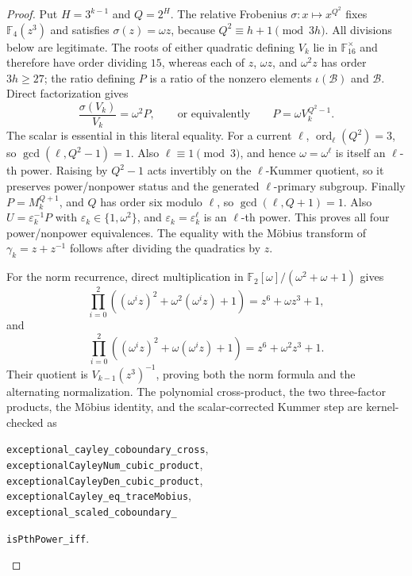 \documentclass[11pt]{article}
\theoremstyle{definition}
\theoremstyle{remark}
\begin{document}
\begin{proof}
Put $H=3^{k-1}$ and $Q=2^H$.  The relative Frobenius
$\sigma:x\mapsto x^{Q^2}$ fixes $\mathbb F_4(z^3)$ and satisfies
$\sigma(z)=\omega z$, because $Q^2\equiv h+1\pmod {3h}$.  All divisions
below are legitimate.  The roots of either quadratic defining $V_k$ lie in
$\mathbb F_{16}^{\times}$ and therefore have order dividing $15$, whereas
each of $z$, $\omega z$, and $\omega^2z$ has order $3h\geq27$; the ratio
defining $P$ is a ratio of the nonzero elements $\iota(\mathcal B)$ and
$\mathcal B$.  Direct factorization gives
\[
 \frac{\sigma(V_k)}{V_k}=\omega^2P,
 \qquad\text{or equivalently}\qquad
 P=\omega V_k^{Q^2-1}.
\]
The scalar is essential in this literal equality.  For a current $\ell$,
$\operatorname{ord}_\ell(Q^2)=3$, so
$\gcd(\ell,Q^2-1)=1$.  Also $\ell\equiv1\pmod3$, and hence
$\omega=\omega^\ell$ is itself an $\ell$-th power.  Raising by
$Q^2-1$ acts invertibly on the $\ell$-Kummer quotient, so it preserves
power/nonpower status and the generated $\ell$-primary subgroup.  Finally
$P=M_k^{Q+1}$, and $Q$ has order six modulo $\ell$, so
$\gcd(\ell,Q+1)=1$.  Also
$U=\varepsilon_k^{-1}P$ with
$\varepsilon_k\in\{1,\omega^2\}$, and
$\varepsilon_k=\varepsilon_k^\ell$ is an $\ell$-th power.  This proves all
four power/nonpower equivalences.  The equality with
the Möbius transform of $\gamma_k=z+z^{-1}$ follows after dividing the
quadratics by $z$.

For the norm recurrence, direct multiplication in
$\mathbb F_2[\omega]/(\omega^2+\omega+1)$ gives
\[
 \prod_{i=0}^2\left((\omega^iz)^2+
        \omega^2(\omega^iz)+1\right)=z^6+\omega z^3+1,
\]
and
\[
 \prod_{i=0}^2\left((\omega^iz)^2+
        \omega(\omega^iz)+1\right)=z^6+\omega^2 z^3+1.
\]
Their quotient is $V_{k-1}(z^3)^{-1}$, proving both the norm formula and
the alternating normalization.  The polynomial cross-product, the two
three-factor products, the Möbius identity, and the scalar-corrected Kummer
step are kernel-checked as
\begin{center}
\texttt{exceptional\_cayley\_coboundary\_cross},\\
\texttt{exceptionalCayleyNum\_cubic\_product},\\
\texttt{exceptionalCayleyDen\_cubic\_product},\\
\texttt{exceptionalCayley\_eq\_traceMobius},\\
\texttt{exceptional\_scaled\_coboundary\_}\par
\texttt{isPthPower\_iff}.
\end{center}


\end{proof}
\end{document}

